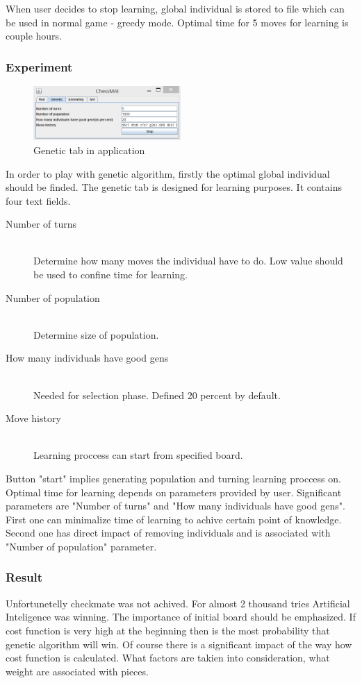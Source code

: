 \documentclass[pdftex]{article}
\begin{document}
When user decides to stop learning, global individual is stored to file which can be used in normal game - greedy mode.
Optimal time for 5 moves for learning is couple hours.

\subsubsection{Experiment}
\begin{figure}[!htb]
	\centering
	\includegraphics[width=0.5\textwidth]{genetic/genetic_gui.png} 
	\caption{Genetic tab in application}
	\label{fig:genetic_gui}
\end{figure}
In order to play with genetic algorithm, firstly the optimal global individual should be finded. 
The genetic tab is designed for learning purposes. It contains four text fields.

\begin{description}
  \item[Number of turns] \hfill \\
  Determine how many moves the individual have to do. Low value should be used to confine time for learning.
  \item[Number of population] \hfill \\
  Determine size of population.
  \item[How many individuals have good gens] \hfill \\
  Needed for selection phase. Defined 20 percent by default.
  \item[Move history] \hfill \\
  Learning proccess can start from specified board.
\end{description}

Button "start" implies generating population and turning learning proccess on.
Optimal time for learning depends on parameters provided by user. Significant parameters are "Number of turns" and "How many individuals have good gens". First one can minimalize time of learning to achive certain point of knowledge. Second one has direct impact of removing individuals and is associated with "Number of population" parameter. 

\subsubsection{Result}
Unfortunetelly checkmate was not achived. 
For almost 2 thousand tries Artificial Inteligence was winning. The importance of initial board should be emphasized. If cost function is very high at the beginning then is the most probability that genetic algorithm will win. Of course there is a significant impact of the way how cost function is calculated. What factors are takien into consideration, what weight are associated with pieces. 
\end{document}
